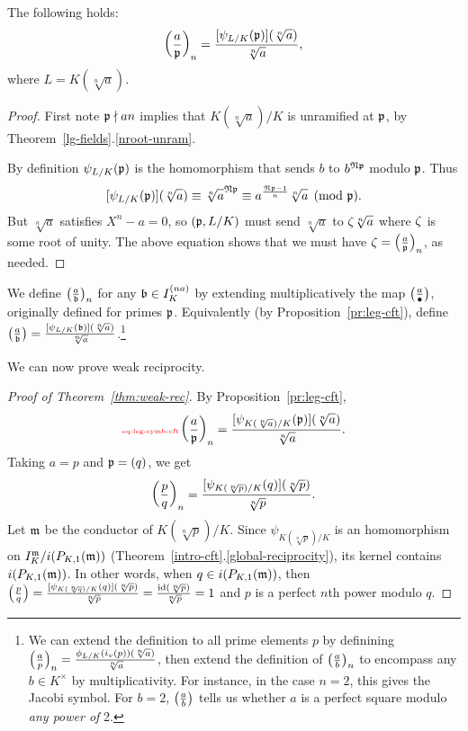 \begin{pr}
The following holds:
\[
\left( {\frac{a}{\mathfrak{p}}} \right)_n=\frac{[\psi_{L/K}(\mathfrak{p})](\sqrt[n]{a})}{\sqrt[n]a},
\]
where $L=K(\sqrt[n] a)$.
\end{pr}
\begin{proof}
First note $\mathfrak{p} \nmid an$ implies that $K(\sqrt[n]a)/K$ is unramified at $\mathfrak{p}$, by Theorem~\ref{lg-fields}.\ref{nroot-unram}.

By definition $\psi_{L/K}(\mathfrak{p})$ is the homomorphism that sends $b$ to $b^{\mathfrak N\mathfrak{p}}$ modulo $\mathfrak{p}$. Thus
\[
[\psi_{L/K}(\mathfrak{p})](\sqrt[n]{a})
\equiv \sqrt[n]{a}^{\mathfrak N\mathfrak{p}}\equiv a^{\frac{\mathfrak N\mathfrak{p}-1}{n}}\sqrt[n]{a}\pmod{\mathfrak{p}}.
\]
But $\sqrt[n]{a}$ satisfies $X^n-a=0$, so $(\mathfrak{p},L/K)$ must send $\sqrt[n]{a}$ to $\zeta\sqrt[n]{a}$ where $\zeta$ is some root of unity. The above equation shows that we must have $\zeta=\left( {\frac{a}{\mathfrak{p}}} \right)_n$, as needed.
\end{proof}
We define $\left( {\frac{a}{\mathfrak{b}}} \right)_n$ for any $\mathfrak{b}\in I_K^{(na)}$ by extending multiplicatively the map $\left( {\frac{a}{\bullet}} \right)$, originally defined for primes $\mathfrak{p}$. Equivalently (by Proposition~\ref{pr:leg-cft}), define $\left( {\frac{a}{\mathfrak{b}}} \right)=\frac{[\psi_{L/K}(\mathfrak{b})](\sqrt[n]{a})}{\sqrt[n]a}$.\footnote{We can extend the definition to all prime elements $p$ by definining $\left( {\frac{a}{p}} \right)_n=\frac{\phi_{L/K}(i_v(p))(\sqrt[n]a)}{\sqrt[n]a}$, then extend the definition of $\left( {\frac{a}{b}} \right)_n$ to encompass any $b\in K^{\times}$ by multiplicativity. For instance, in the case $n=2$, this gives the Jacobi symbol. For $b=2$, $\left( {\frac{a}{b}} \right)$ tells us whether $a$ is a perfect square modulo {\it any power of }2.}

We can now prove weak reciprocity.
\begin{proof}[Proof of Theorem~\ref{thm:weak-rec}]
By Proposition~\ref{pr:leg-cft}, 
\begin{equation}\llabel{eq:leg-symb-cft}
\pf{a}{\mfp}_n=\fc{[\psi_{K(\sqrt[n]a)/K}(\mfp)](\sqrt[n]{a})}{\sqrt[n]a}.
\end{equation}
Taking $a=p$ and $\mathfrak{p}=(q)$, we get
\[
\left( {\frac{p}{q}} \right)_n=\frac{[\psi_{K(\sqrt[n]p)/K}(q)](\sqrt[n]{p})}{\sqrt[n]p}.
\]
Let $\mathfrak{m}$ be the conductor of $K(\sqrt[n]p)/K$. 
Since $\psi_{K(\sqrt[n]p)/K}$ is an homomorphism on $I_K^{\mathfrak{m}}/i(P_{K,1}(\mathfrak{m}))$ (Theorem~\ref{intro-cft}.\ref{global-reciprocity}), its kernel contains $i(P_{K,1}(\mathfrak{m}))$. In other words, when $q\in i(P_{K,1}(\mathfrak{m}))$, then $\left( {\frac{p}{q}} \right)=\frac{[\psi_{K(\sqrt[n]q)/K}(q)](\sqrt[n]{p})}{\sqrt[n]p}=\frac{\mathrm{id}(\sqrt[n]{p})}{\sqrt[n]p}=1$ and $p$ is a perfect $n$th power modulo $q$.
\end{proof}
